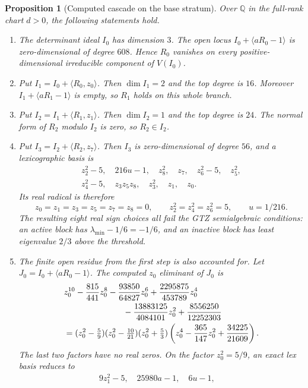 \documentclass[11pt]{article}
\numberwithin{equation}{section}
\newtheorem{proposition}[theorem]{Proposition}
\theoremstyle{definition}
\begin{document}
\begin{proposition}[Computed cascade on the base stratum]\label{prop:cad-cascade}
Over $\mathbb Q$ in the full-rank chart $d>0$, the following statements hold.
\begin{enumerate}[leftmargin=*]
\item The determinant ideal $I_0$ has dimension $3$.  The open locus
$I_0+\langle aR_0-1\rangle$ is zero-dimensional of degree $608$.  Hence $R_0$
vanishes on every positive-dimensional irreducible component of $V(I_0)$.
\item Put $I_1=I_0+\langle R_0,z_0\rangle$.  Then
$\dim I_1=2$ and the top degree is $16$.  Moreover
$I_1+\langle aR_1-1\rangle$ is empty, so $R_1$ holds on this whole branch.
\item Put $I_2=I_1+\langle R_1,z_1\rangle$.  Then
$\dim I_2=1$ and the top degree is $24$.  The normal form of $R_2$ modulo
$I_2$ is zero, so $R_2\in I_2$.
\item Put $I_3=I_2+\langle R_2,z_7\rangle$.  Then $I_3$ is zero-dimensional of
degree $56$, and a lexicographic basis is
\[
\begin{gathered}
z_2^2-5,\quad 216u-1,\quad z_8^2,\quad z_7,\quad z_6^2-5,\quad z_5^2,\\
z_4^2-5,\quad z_3z_5z_8,\quad z_3^2,\quad z_1,\quad z_0.
\end{gathered}
\]
Its real radical is therefore
\[
z_0=z_1=z_3=z_5=z_7=z_8=0,\qquad
z_2^2=z_4^2=z_6^2=5,\qquad u=1/216.
\]
The resulting eight real sign choices all fail the GTZ semialgebraic
conditions: an active block has $\lambda_{\min}-1/6=-1/6$, and an inactive block
has least eigenvalue $2/3$ above the threshold.
\item The finite open residue from the first step is also accounted for.  Let
$J_0=I_0+\langle aR_0-1\rangle$.  The computed $z_0$ eliminant of $J_0$ is
\[
\begin{split}
&z_0^{10}-\frac{815}{441}z_0^8-\frac{93850}{64827}z_0^6
  +\frac{2295875}{453789}z_0^4\\
&\hspace{25mm}
  -\frac{13883125}{4084101}z_0^2+\frac{8556250}{12252303}\\
&=(z_0^2-\tfrac59)(z_0^2-\tfrac{10}{21})(z_0^2+\tfrac53)
  \left(z_0^4-\frac{365}{147}z_0^2+\frac{34225}{21609}\right).
\end{split}
\]
The last two factors have no real zeros.  On the factor $z_0^2=5/9$, an exact
lex basis reduces to
\[
\begin{gathered}
9z_1^2-5,\quad 25980a-1,\quad 6u-1,\quad

\end{gathered}\]
\end{enumerate}
\end{proposition}
\end{document}
